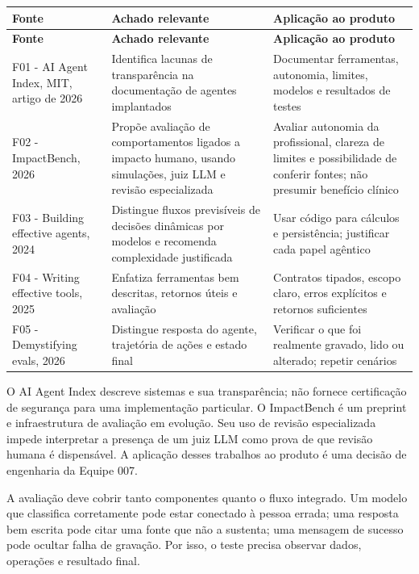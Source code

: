 \documentclass[11pt,a4paper]{article}
\begin{document}
\begingroup\small
\begin{longtable}{>{\raggedright\arraybackslash}p{}>{\raggedright\arraybackslash}p{}>{\raggedright\arraybackslash}p{}}
\toprule
\textbf{Fonte} & \textbf{Achado relevante} & \textbf{Aplicação ao produto} \\ \midrule\endfirsthead
\toprule
\textbf{Fonte} & \textbf{Achado relevante} & \textbf{Aplicação ao produto} \\ \midrule\endhead
\bottomrule\endfoot
F01 - AI Agent Index, MIT, artigo de 2026 & Identifica lacunas de transparência na documentação de agentes implantados & Documentar ferramentas, autonomia, limites, modelos e resultados de testes \\[3pt]
F02 - ImpactBench, 2026 & Propõe avaliação de comportamentos ligados a impacto humano, usando simulações, juiz LLM e revisão especializada & Avaliar autonomia da profissional, clareza de limites e possibilidade de conferir fontes; não presumir benefício clínico \\[3pt]
F03 - Building effective agents, 2024 & Distingue fluxos previsíveis de decisões dinâmicas por modelos e recomenda complexidade justificada & Usar código para cálculos e persistência; justificar cada papel agêntico \\[3pt]
F04 - Writing effective tools, 2025 & Enfatiza ferramentas bem descritas, retornos úteis e avaliação & Contratos tipados, escopo claro, erros explícitos e retornos suficientes \\[3pt]
F05 - Demystifying evals, 2026 & Distingue resposta do agente, trajetória de ações e estado final & Verificar o que foi realmente gravado, lido ou alterado; repetir cenários \\[3pt]
\end{longtable}
\endgroup
O AI Agent Index descreve sistemas e sua transparência; não fornece certificação de segurança para uma implementação particular. O ImpactBench é um preprint e infraestrutura de avaliação em evolução. Seu uso de revisão especializada impede interpretar a presença de um juiz LLM como prova de que revisão humana é dispensável. A aplicação desses trabalhos ao produto é uma decisão de engenharia da Equipe 007.

A avaliação deve cobrir tanto componentes quanto o fluxo integrado. Um modelo que classifica corretamente pode estar conectado à pessoa errada; uma resposta bem escrita pode citar uma fonte que não a sustenta; uma mensagem de sucesso pode ocultar falha de gravação. Por isso, o teste precisa observar dados, operações e resultado final.
\end{document}
